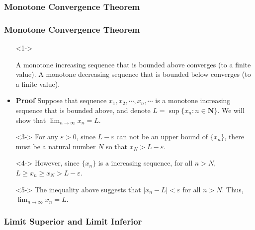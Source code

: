 \documentclass[handout]{beamer}
\begin{document}
\subsubsection{Monotone Convergence Theorem}

\frame
{
  \frametitle{Monotone Convergence Theorem}

  \begin{itemize}
  \item [] <1-> \begin{Theorem} A monotone increasing sequence that is bounded above converges (to a finite value). A monotone decreasing sequence that is bounded below converges (to a finite value). \end{Theorem} 

    \item<2-> \textbf{Proof} Suppose that sequence $x_1,x_2,\cdots,x_n,\cdots $ is a monotone increasing sequence that is bounded above, and denote $L=\sup\{x_n: n\in \mathbf{N}\}$. We will show that $\lim_{n\rightarrow\infty} x_n=L$.

    \item[]<3->  For any $\varepsilon>0$, since $L-\varepsilon$ can not be an upper bound of $\{x_n\}$, there must be a natural number $N$ so that $x_N>L-\varepsilon$. 
        \item[]<4-> However, since $\{x_n\} $ is a increasing sequence, for all $n>N$, $L\geq x_n\geq x_N>L-\varepsilon$. 
        
         \item[]<5->  The inequality above suggests that $|x_n-L|<\varepsilon$ for all $n>N$. Thus, $\lim_{n\rightarrow\infty} x_n=L$.         
  \end{itemize}
}



\subsubsection{Limit Superior and Limit Inferior}
\end{document}
